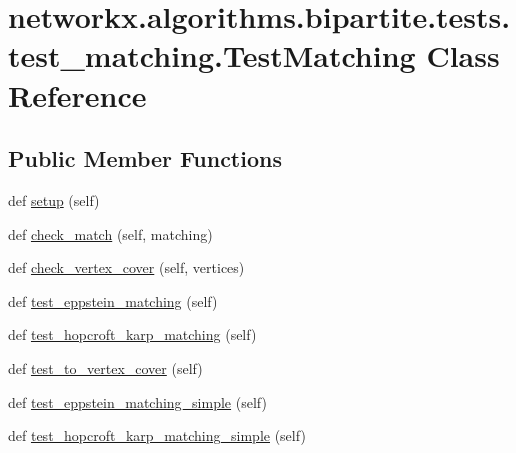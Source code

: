 \hypertarget{classnetworkx_1_1algorithms_1_1bipartite_1_1tests_1_1test__matching_1_1TestMatching}{}\section{networkx.\+algorithms.\+bipartite.\+tests.\+test\+\_\+matching.\+Test\+Matching Class Reference}
\label{classnetworkx_1_1algorithms_1_1bipartite_1_1tests_1_1test__matching_1_1TestMatching}
\subsection*{Public Member Functions}
\begin{DoxyCompactItemize}
\item 
def \hyperlink{classnetworkx_1_1algorithms_1_1bipartite_1_1tests_1_1test__matching_1_1TestMatching_a1fb4ac130e9731f76d752a3957558487}{setup} (self)
\item 
def \hyperlink{classnetworkx_1_1algorithms_1_1bipartite_1_1tests_1_1test__matching_1_1TestMatching_a2e4204b947c75592a4673c692648ac14}{check\+\_\+match} (self, matching)
\item 
def \hyperlink{classnetworkx_1_1algorithms_1_1bipartite_1_1tests_1_1test__matching_1_1TestMatching_afd6b0dbda83fa09ab5e9af79672e03bd}{check\+\_\+vertex\+\_\+cover} (self, vertices)
\item 
def \hyperlink{classnetworkx_1_1algorithms_1_1bipartite_1_1tests_1_1test__matching_1_1TestMatching_af2dae618474379d877a526602fafdba5}{test\+\_\+eppstein\+\_\+matching} (self)
\item 
def \hyperlink{classnetworkx_1_1algorithms_1_1bipartite_1_1tests_1_1test__matching_1_1TestMatching_ade1fd785a9883a0dc0d5fa05bfdad02b}{test\+\_\+hopcroft\+\_\+karp\+\_\+matching} (self)
\item 
def \hyperlink{classnetworkx_1_1algorithms_1_1bipartite_1_1tests_1_1test__matching_1_1TestMatching_ac1dd8e02981ece634e6d8575eb8bfa52}{test\+\_\+to\+\_\+vertex\+\_\+cover} (self)
\item 
def \hyperlink{classnetworkx_1_1algorithms_1_1bipartite_1_1tests_1_1test__matching_1_1TestMatching_acf4f3a7f47f0d527ba522e116e071bf1}{test\+\_\+eppstein\+\_\+matching\+\_\+simple} (self)
\item 
def \hyperlink{classnetworkx_1_1algorithms_1_1bipartite_1_1tests_1_1test__matching_1_1TestMatching_a78457d1bd4ce5684d10be37b327ee587}{test\+\_\+hopcroft\+\_\+karp\+\_\+matching\+\_\+simple} (self)

\end{DoxyCompactItemize}
